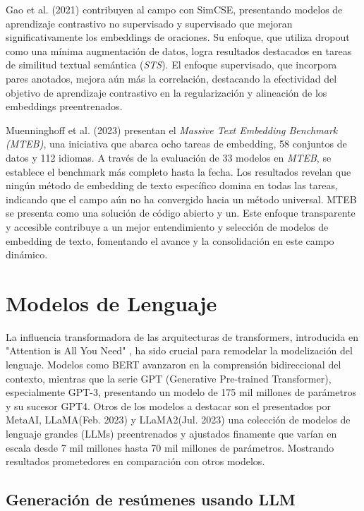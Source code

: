     Gao et al. (2021)\cite{gao2022simcse} contribuyen al campo con SimCSE, presentando modelos de aprendizaje contrastivo no supervisado y supervisado que mejoran significativamente los embeddings de oraciones. Su enfoque, que utiliza dropout como una mínima augmentación de datos, logra resultados destacados en tareas de similitud textual semántica (\emph{STS}). El enfoque supervisado, que incorpora pares anotados, mejora aún más la correlación, destacando la efectividad del objetivo de aprendizaje contrastivo en la regularización y alineación de los embeddings preentrenados.

    Muenninghoff et al. (2023)\cite{muennighoff2023mteb} presentan el \emph{Massive Text Embedding Benchmark (MTEB)}, una iniciativa que abarca ocho tareas de embedding, 58 conjuntos de datos y 112 idiomas. A través de la evaluación de 33 modelos en \emph{MTEB}, se establece el benchmark más completo hasta la fecha. Los resultados revelan que ningún método de embedding de texto específico domina en todas las tareas, indicando que el campo aún no ha convergido hacia un método universal. MTEB se presenta como una solución de código abierto y un\cite[leaderboard público]{leaderboard}. Este enfoque transparente y accesible contribuye a un mejor entendimiento y selección de modelos de embedding de texto, fomentando el avance y la consolidación en este campo dinámico.

\section{Modelos de Lenguaje}
   
    La influencia transformadora de las arquitecturas de transformers, introducida en "Attention is All You Need" \cite{attention}, ha sido crucial para remodelar la modelización del lenguaje. Modelos como BERT\cite{BERT} avanzaron en la comprensión bidireccional del contexto, mientras que la serie GPT (Generative Pre-trained Transformer), especialmente GPT-3\cite{brown2020language}, presentando un modelo de 175 mil millones de parámetros y su sucesor GPT4\cite{openai2023gpt4}. Otros de los modelos a destacar son el presentados por MetaAI, LLaMA(Feb. 2023)\cite{llamapaper} y LLaMA2(Jul. 2023)\cite{llamapaper2} una colección de modelos de lenguaje grandes (LLMs) preentrenados y ajustados finamente que varían en escala desde 7 mil millones hasta 70 mil millones de parámetros. Mostrando resultados prometedores en comparación con otros modelos\cite{metallama}. 
    
    \subsection{Generación de resúmenes usando LLM}

